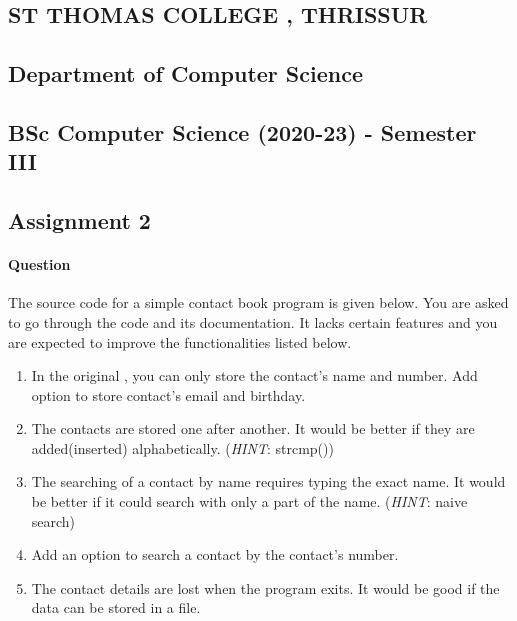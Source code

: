 \documentclass[
]{article}
\author{}
\date{}
\providecommand{\tightlist}{%
  \setlength{\itemsep}{0pt}\setlength{\parskip}{0pt}}
\begin{document}
\begin{center}
\hypertarget{st-thomas-college-thrissur}{%
\subsection{ST THOMAS COLLEGE ,
THRISSUR}\label{st-thomas-college-thrissur}}

\hypertarget{department-of-computer-science}{%
\subsection{Department of Computer
Science}\label{department-of-computer-science}}

\hypertarget{bsc-computer-science-2020-23---semester-iii}{%
\subsection{BSc Computer Science (2020-23) - Semester
III}\label{bsc-computer-science-2020-23---semester-iii}}
\end{center}

\hypertarget{assignment-2}{%
\subsection{Assignment 2}\label{assignment-2}}

\hypertarget{question}{%
\paragraph{Question}\label{question}}

The source code for a simple contact book program is given below. You
are asked to go through the code and its documentation. It lacks certain
features and you are expected to improve the functionalities listed
below.

\begin{enumerate}
\def\labelenumi{\arabic{enumi}.}
\tightlist
\item
  In the original , you can only store the contact's name and number.
  Add option to store contact's email and birthday.
\item
  The contacts are stored one after another. It would be better if they
  are added(inserted) alphabetically. (\emph{HINT}: strcmp())
\item
  The searching of a contact by name requires typing the exact name. It
  would be better if it could search with only a part of the name.
  (\emph{HINT}: naive search)
\item
  Add an option to search a contact by the contact's number.
\item
  The contact details are lost when the program exits. It would be good
  if the data can be stored in a file.
\end{enumerate}
\end{document}

